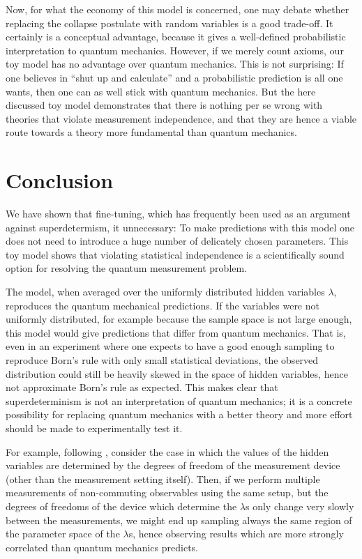 \documentclass[12pt]{article}
\begin{document}
Now, for what the economy of this model is concerned, one may debate whether replacing the collapse postulate with random variables is a good trade-off. It certainly is a conceptual advantage, because it gives a well-defined probabilistic interpretation to quantum mechanics. However, if we merely count axioms, our toy model has no advantage over quantum mechanics. This is not surprising: If one believes in ``shut up and calculate'' and a probabilistic prediction is all one wants, then one can as well stick with quantum mechanics. But the here discussed toy model demonstrates that there is nothing per se wrong with theories that violate measurement independence, and that they are hence a viable route towards a theory more fundamental than quantum mechanics. 


\section{Conclusion}

 We have shown that fine-tuning, which has frequently been used as an argument against superdetermism, it unnecessary: To make predictions with this model one does not need to introduce a huge number of delicately chosen parameters. This toy model shows that  violating statistical independence is a scientifically sound option for resolving the quantum measurement problem. 

The model, when averaged over the uniformly distributed hidden variables $\lambda$, reproduces the quantum mechanical predictions. If the variables were not uniformly distributed, for example because the sample space is not large enough, this model would give predictions that differ from quantum mechanics. That is, even in an experiment where one expects to have a good enough sampling to reproduce Born's rule with only small statistical deviations, the observed distribution could still be heavily skewed in the space of hidden variables, hence not approximate Born's rule as expected. This makes clear that superdeterminism is not an interpretation of quantum mechanics; it is a concrete possibility for replacing quantum mechanics with a better theory and more effort should be made to experimentally test it.

For example, following \cite{Hossenfelder:2011ct}, consider the case in which the values of the hidden variables are determined by the degrees of freedom of the measurement device (other than the measurement setting itself). Then, if we perform multiple measurements of non-commuting observables using the same setup, but the degrees of freedoms of the device which determine the $\lambda$s only change very slowly between the measurements, we might end up sampling always the same region of the parameter space of the $\lambda$s, hence observing results which are more strongly correlated than quantum mechanics predicts.
\end{document}
